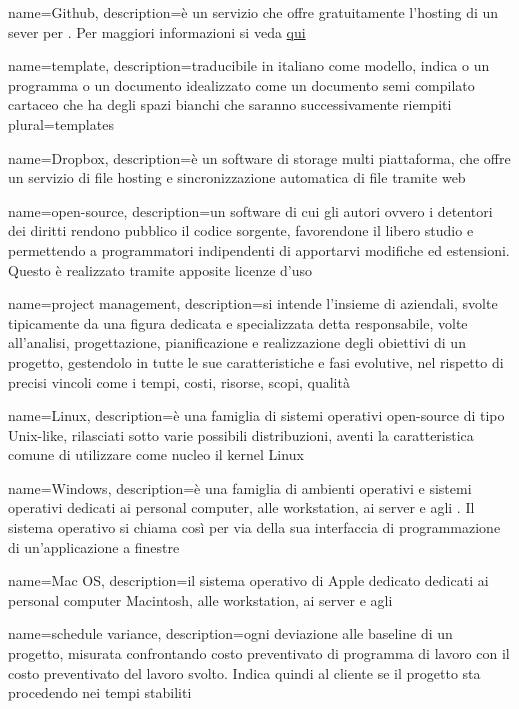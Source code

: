  {
	name=Github,
	description={è un servizio che offre gratuitamente l'hosting di un sever per . Per maggiori informazioni si veda \href{https://github.com}{qui}}
}

 {
	name=template,
	description={traducibile in italiano come modello, indica o un programma o un documento idealizzato come un documento semi compilato cartaceo che ha degli spazi bianchi che saranno successivamente riempiti}
	plural=templates
}

 {
	name=Dropbox,
	description={è un software di  storage multi piattaforma, che offre un servizio di file hosting e sincronizzazione automatica di file tramite web}
}

 {
	name=open-source,
	description={un software di cui gli autori ovvero i detentori dei diritti rendono pubblico il codice sorgente, favorendone il libero studio e permettendo a programmatori indipendenti di apportarvi modifiche ed estensioni. Questo è realizzato tramite apposite licenze d'uso}
}

 {
	name=project management,
	description={si intende l'insieme di  aziendali, svolte tipicamente da una figura dedicata e specializzata detta responsabile, volte all'analisi, progettazione, pianificazione e realizzazione degli obiettivi di un progetto, gestendolo in tutte le sue caratteristiche e fasi evolutive, nel rispetto di precisi vincoli come i tempi, costi, risorse, scopi, qualità}
}

 {
	name=Linux,
	description={è una famiglia di sistemi operativi open-source di tipo Unix-like, rilasciati sotto varie possibili distribuzioni, aventi la caratteristica comune di utilizzare come nucleo il kernel Linux}
}

 {
	name=Windows,
	description={è una famiglia di ambienti operativi e sistemi operativi dedicati ai personal computer, alle workstation, ai server e agli . Il sistema operativo si chiama così per via della sua interfaccia di programmazione di un'applicazione a finestre}
}

 {
	name=Mac OS,
	description={il sistema operativo di Apple dedicato dedicati ai personal computer Macintosh, alle workstation, ai server e agli   }
}


 {
	name=schedule variance,
	description={ogni deviazione alle baseline di un progetto, misurata confrontando costo preventivato di programma di lavoro con il costo preventivato del lavoro svolto. Indica quindi al cliente se il progetto sta procedendo nei tempi stabiliti}
}

